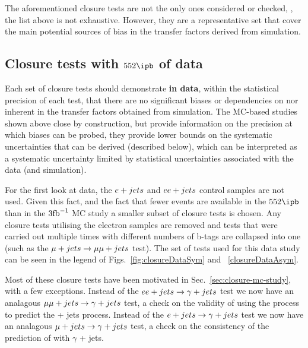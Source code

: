 The aforementioned closure tests are not the only ones considered or
checked, \ie, the list above is not exhaustive. However, they are a
representative set that cover the main potential sources of bias in
the transfer factors derived from simulation. 

\subsection{Closure tests with $552\ipb$ of data}
\label{sec:closure-data-study}

Each set of closure tests should demonstrate {\bf in data}, within the
statistical precision of each test, that there are no significant
biases or dependencies on \njet nor \scalht inherent in the transfer
factors obtained from simulation. The MC-based studies shown above
close by construction, but provide information on the precision at
which biases can be probed, \ie they provide lower bounds on the
systematic uncertainties that can be derived (described below), which
can be interpreted as a systematic uncertainty limited by statistical
uncertainties associated with the data (and simulation).

For the first look at data, the $\ej$ and $\eej$ control samples are
not used. Given this fact, and the fact that fewer events are
available in the $552\ipb$ than in the $3\ifb$ MC study a smaller
subset of closure tests is chosen. Any closure tests utilising the
electron samples are removed and tests that were carried out
multiple times with different numbers of b-tags are collapsed into one
(such as the $\mj\rightarrow\mmj$ test). The set of tests used for
this data study can be seen in the legend of
Figs.~\ref{fig:closureDataSym} and ~\ref{closureDataAsym}. 

Most of these closure tests have been motivated in
Sec.~\ref{sec:closure-mc-study}, with a few exceptions. Instead of the
$\eej\rightarrow\gj$ test we now have an analagous
$\mmj\rightarrow\gj$ test, a check on the validity of using the \gj
process to predict the \znunu + jets process. Instead of the 
$\ej\rightarrow\gj$ test we now have an analagous
$\mj\rightarrow\gj$ test, a check on 
the consistency of the prediction of \wej with $\gamma$ + jets.

